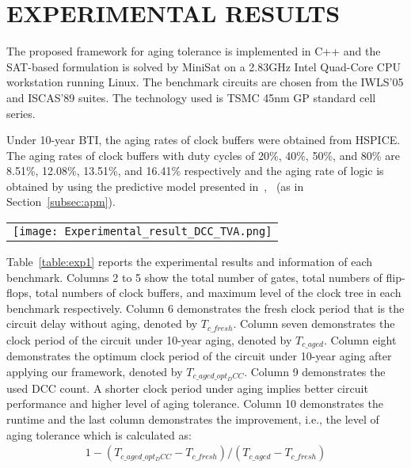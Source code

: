 \section{EXPERIMENTAL RESULTS}
\label{sec:exp}
The proposed framework for aging tolerance is implemented in C++ and the SAT-based formulation is solved by MiniSat on a 2.83GHz Intel Quad-Core CPU workstation running Linux. The benchmark circuits are chosen from the IWLS'05 and ISCAS'89 suites. The technology used is TSMC 45nm GP standard cell series.

Under 10-year BTI, the aging rates of clock buffers were obtained from HSPICE. The aging rates of clock buffers with duty cycles of 20\%, 40\%, 50\%, and 80\% are 8.51\%, 12.08\%, 13.51\%, and 16.41\% respectively and the aging rate of logic is obtained by using the predictive model presented in~\cite{wang2010impact},~\cite{wang2007efficient} (as in Section~\ref{subsec:apm}).

\begin{table*}
\centering
\caption{Results of aging tolerance}
	\begin{tabular}{l}
	\texttt{[image: Experimental\_result\_DCC\_TVA.png]}
	\end{tabular}
\label{table:exp1}
\end{table*}

Table~\ref{table:exp1} reports the experimental results and information of each benchmark. Columns 2 to 5 show the total number of gates, total numbers of flip-flops, total numbers of clock buffers, and maximum level of the clock tree in each benchmark respectively. Column 6 demonstrates the fresh clock period that is the circuit delay without aging, denoted by $T_{c\_fresh}$. Column seven demonstrates the clock period of the circuit under 10-year aging, denoted by $T_{c\_aged}$. Column eight demonstrates the optimum clock period of the circuit under 10-year aging after applying our framework, denoted by $T_{c\_aged\_opt_DCC}$. Column 9 demonstrates the used DCC count. A shorter clock period under aging implies better circuit performance and higher level of aging tolerance. Column 10 demonstrates the runtime and the last column demonstrates the improvement, i.e., the level of aging tolerance which is calculated as:
\begin{gather*}
1 - (T_{c\_aged\_opt_DCC} - T_{c\_fresh}) / (T_{c\_aged} - T_{c\_fresh})
\end{gather*}


